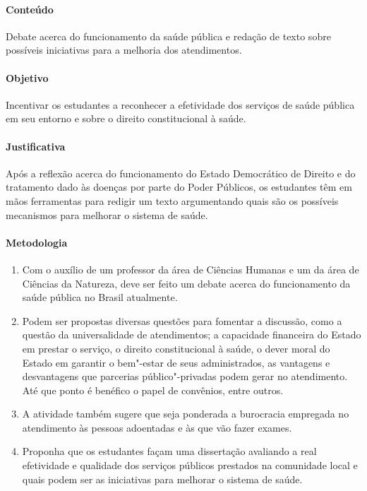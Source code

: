 \documentclass[12pt]{extarticle}
\begin{document}
\paragraph{Conteúdo} Debate acerca do funcionamento da saúde pública
e redação de texto sobre possíveis iniciativas para a melhoria dos atendimentos.

\paragraph{Objetivo} Incentivar os estudantes a reconhecer a efetividade
dos serviços de saúde pública em seu entorno e sobre o direito
constitucional à saúde.

\paragraph{Justificativa} Após a reflexão acerca do 
funcionamento do Estado Democrático de Direito
e do tratamento dado às doenças por parte do Poder Públicos, os estudantes 
têm em mãos ferramentas para redigir um texto argumentando quais são os 
possíveis mecanismos para melhorar o sistema de saúde.

\paragraph{Metodologia}

\begin{enumerate} 

\item Com o auxílio de um professor da área de Ciências 
Humanas e um da área de Ciências da Natureza, deve ser feito um debate
acerca do funcionamento da saúde pública no Brasil atualmente.

\item Podem ser propostas diversas questões para fomentar a discussão, como a
questão da universalidade de atendimentos; a capacidade financeira do
Estado em prestar o serviço, o direito constitucional à saúde, o dever
moral do Estado em garantir o bem"-estar de seus administrados, as
vantagens e desvantagens que parcerias público"-privadas podem gerar no
atendimento. Até que ponto é benéfico o papel de convênios, entre
outros.

\item A atividade também sugere que seja ponderada a burocracia
empregada no atendimento às pessoas adoentadas e às que vão
fazer exames.

\item Proponha que os estudantes façam uma dissertação
avaliando a real efetividade e qualidade dos serviços públicos prestados
na comunidade local e quais podem ser as 
iniciativas para melhorar o sistema de saúde.

\end{enumerate}
\end{document}
